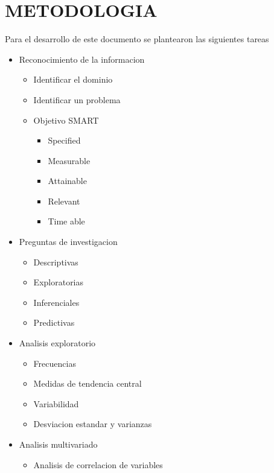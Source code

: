 \section{METODOLOGIA}
 Para el desarrollo de este documento se plantearon las siguientes tareas
 \begin{itemize}
  \item Reconocimiento de la informacion
  \begin{itemize}
   \item Identificar el dominio
   \item Identificar un problema
   \item Objetivo SMART  
    \begin{itemize}
     \item Specified
     \item Measurable
     \item Attainable
     \item Relevant
     \item Time able               
    \end{itemize}
  \end{itemize}
  \item Preguntas de investigacion
  \begin{itemize}
   \item Descriptivas
   \item Exploratorias
   \item Inferenciales
   \item Predictivas
  \end{itemize}
  \item Analisis exploratorio
  \begin{itemize}
   \item Frecuencias
   \item Medidas de tendencia central
   \item Variabilidad
   \item Desviacion estandar y varianzas
  \end{itemize}
  \item Analisis multivariado
  \begin{itemize}
	\item Analisis de correlacion de variables
  \end{itemize}  
 \end{itemize}
